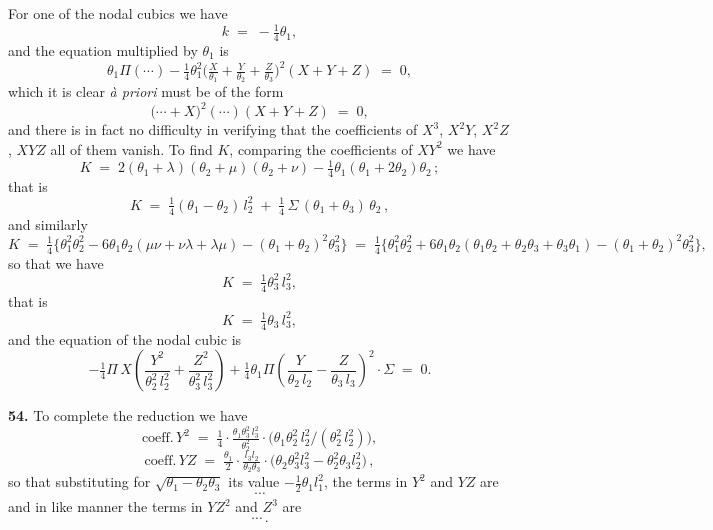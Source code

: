 \documentclass[11pt,a4paper]{article}
\begin{document}
\medskip

For one of the nodal cubics we have
\[
k \;=\; -\tfrac{1}{4}\theta_{1},
\]
and the equation multiplied by $\theta_{1}$ is
\[
\theta_{1}\Pi(\cdots) - \tfrac{1}{4}\theta_{1}^{2}\bigl(\tfrac{X}{\theta_{1}}+\tfrac{Y}{\theta_{2}}+\tfrac{Z}{\theta_{3}}\bigr)^{2}(X+Y+Z) \;=\; 0,
\]
which it is clear \emph{\`a priori} must be of the form
\[
\bigl(\cdots + X\bigr)^{2}(\cdots)(X+Y+Z) \;=\; 0,
\]
and there is in fact no difficulty in verifying that the coefficients of $X^{3}$, $X^{2}Y$, $X^{2}Z$, $XYZ$ all of them vanish. To find $K$, comparing the coefficients of $XY^{2}$ we have
\[
K \;=\; 2(\theta_{1}+\lambda)(\theta_{2}+\mu)(\theta_{2}+\nu) - \tfrac{1}{4}\theta_{1}(\theta_{1}+2\theta_{2})\theta_{2}\,;
\]
that is
\[
K \;=\; \tfrac{1}{4}(\theta_{1}-\theta_{2})\,l_{2}^{2} \;+\; \tfrac{1}{4}\,\Sigma\,(\theta_{1}+\theta_{3})\,\theta_{2}\,,
\]
and similarly
\[
K \;=\; \tfrac{1}{4}\bigl\{\theta_{1}^{2}\theta_{2}^{2} - 6\theta_{1}\theta_{2}(\mu\nu+\nu\lambda+\lambda\mu)-(\theta_{1}+\theta_{2})^{2}\theta_{3}^{2}\bigr\} \;=\; \tfrac{1}{4}\bigl\{\theta_{1}^{2}\theta_{2}^{2} + 6\theta_{1}\theta_{2}(\theta_{1}\theta_{2}+\theta_{2}\theta_{3}+\theta_{3}\theta_{1})-(\theta_{1}+\theta_{2})^{2}\theta_{3}^{2}\bigr\},
\]
so that we have
\[
K \;=\; \tfrac{1}{4}\theta_{3}^{2}\,l_{3}^{2},
\]
that is
\[
K \;=\; \tfrac{1}{4}\theta_{3}\,l_{3}^{2},
\]
and the equation of the nodal cubic is
\[
-\tfrac{1}{4}\Pi\,X\!\left(\frac{Y^{2}}{\theta_{2}^{2}\,l_{2}^{2}} + \frac{Z^{2}}{\theta_{3}^{2}\,l_{3}^{2}}\right) + \tfrac{1}{4}\theta_{1}\Pi\!\left(\frac{Y}{\theta_{2}\,l_{2}} - \frac{Z}{\theta_{3}\,l_{3}}\right)^{2}\!\cdot\Sigma \;=\; 0.
\]

\medskip

\textbf{54.} To complete the reduction we have
\[
\text{coeff.}\, Y^{2} \;=\; \tfrac{1}{4}\cdot\tfrac{\theta_{1}\theta_{3}^{2}\,l_{3}^{2}}{\theta_{2}^{2}}\cdot\bigl(\theta_{1}\theta_{2}^{2}\,l_{2}^{2}/(\theta_{2}^{2}\,l_{2}^{2})\bigr),
\]
\[
\text{coeff.}\, YZ \;=\; \tfrac{\theta_{1}}{2}\cdot\tfrac{l_{3}l_{2}}{\theta_{2}\theta_{3}}\cdot\bigl(\theta_{2}\theta_{3}^{2}l_{3}^{2} - \theta_{2}^{2}\theta_{3}l_{2}^{2}\bigr)\,,
\]
so that substituting for $\sqrt{\theta_{1}-\theta_{2}\theta_{3}}$ its value $-\tfrac{1}{2}\theta_{1}l_{1}^{2}$, the terms in $Y^{2}$ and $Y Z$ are
\[
\cdots
\]
and in like manner the terms in $YZ^{2}$ and $Z^{3}$ are
\[
\cdots\,.
\]

\medskip
\end{document}
